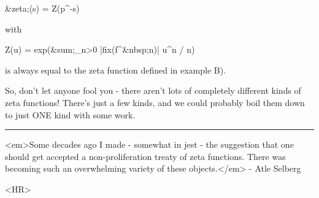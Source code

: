 &zeta;(s) = Z(p^{-s})

with 

Z(u) = exp(&sum;_{n>0} |fix(f^{&nbsp;n})| u^{n} / n)

is always equal to the zeta function defined in example B).

So, don't let anyone fool you - there aren't lots of completely
different kinds of zeta functions!  There's just a few kinds, and 
we could probably boil them down to just ONE kind with some work.







\par\noindent\rule{\textwidth}{0.4pt}
<em>Some decades ago I made - somewhat in jest - the suggestion that one should 
get accepted a non-proliferation treaty of zeta functions.  There was 
becoming such an overwhelming variety of these objects.</em> - Atle Selberg

<HR>



